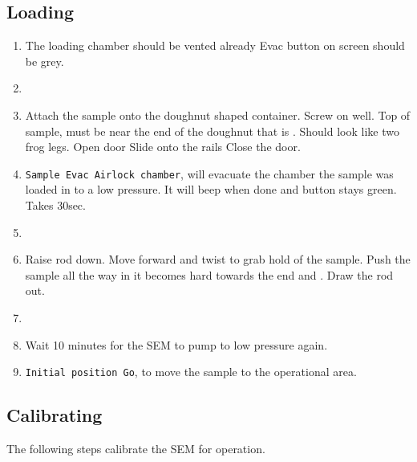   \subsection{Loading}
  \begin{enumerate}
  	\item The loading chamber should be vented already \ra Evac button on screen should be grey.
  	\item {}
  	\item Attach the sample onto the doughnut shaped container. Screw on well. Top of sample, must be near the end of the doughnut that is . Should look like two frog legs.
  	 Open door \ra Slide onto the rails  Close the door.
  	\item \texttt{Sample \ra Evac \ra Airlock chamber}, will evacuate the chamber the sample was loaded in to a low pressure. It will beep when done and button stays green. Takes 30sec.
  	\item {}
  	\item Raise rod down.  Move forward {and twist} to grab hold of the sample. Push the sample all the way in {it becomes hard towards the end} and . Draw the rod out.
  	\item {}
  	\item Wait 10 minutes for the SEM to pump to low pressure again.
  	\item \texttt{Initial position \ra Go}, to move the sample to the operational area.
  \end{enumerate}

  \subsection{Calibrating}
  The following steps calibrate the SEM for operation.
  
